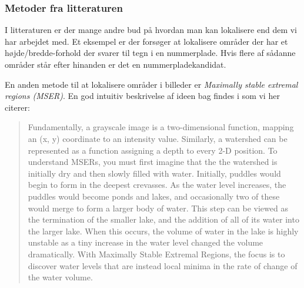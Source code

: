 \subsubsection{Metoder fra litteraturen}
I litteraturen er der mange andre bud på hvordan man kan lokalisere end dem vi har arbejdet med. Et eksempel er \cite{parker} der forsøger at lokalisere områder der har et højde/bredde-forhold der svarer til tegn i en nummerplade. Hvis flere af sådanne områder står efter hinanden er det en nummerpladekandidat.

En anden metode til at lokalisere områder i billeder er \textit{Maximally stable extremal regions (MSER)}. En god intuitiv beskrivelse af ideen bag findes i \cite{murphy} som vi her citerer:
\begin{quote}
Fundamentally, a grayscale image is a two-dimensional function, mapping an (x, y) coordinate to an intensity value. Similarly, a watershed can be represented as a function assigning a depth to every 2-D position. To understand MSERs, you must first imagine that the the watershed is initially dry and then slowly filled with water. Initially, puddles would begin to form in the deepest crevasses. As the water level increases, the puddles would become ponds and lakes, and occasionally two of these would merge to form a larger body of water. This step can be viewed as the termination of the smaller lake, and the addition of all of its water into the larger lake. When this occurs, the volume of water in the lake is highly unstable as a tiny increase in the water level changed the volume dramatically. With Maximally Stable Extremal Regions, the focus is to discover water levels that are instead local minima in the rate of change of the water volume.
\end{quote}



